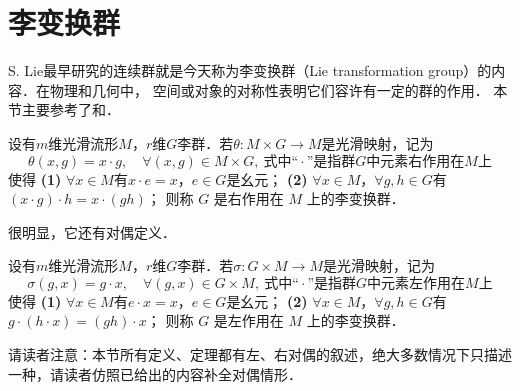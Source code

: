 
\section{李变换群}\label{chlg:sec_Lie-transformation-group}

S. Lie最早研究的连续群就是今天称为李变换群（Lie transformation group）的内容．在物理和几何中，
空间或对象的对称性表明它们容许有一定的群的作用．
本节主要参考了\parencite[\S 6.5]{chenwh2001}和\parencite[\S 9.3]{marsden-1999-IMS}．



\begin{definition}\label{chlg:def_Lie-Trans-R}
    设有$m$维光滑流形$M$，$r$维$G$李群．若$\theta:M\times G \to M$是光滑映射，记为
    \begin{equation*}
        \theta(x,g)=x\cdot g,\quad \forall(x,g)\in M\times G,
        \ \text{式中“} \cdot \text{”是指群}G\text{中元素右作用在}M \text{上}
    \end{equation*}
    使得
    {\bfseries (1)} $\forall x\in M$有$x\cdot e=x$，$e\in G$是幺元；
    {\bfseries (2)} $\forall x \in M$，$\forall g, h \in G$有$(x \cdot g) \cdot h=x \cdot(g h)$；
    则称 $G$ 是{\heiti 右作用在 $M$ 上的李变换群}．
\end{definition}

很明显，它还有对偶定义．
\begin{definition}\label{chlg:def_Lie-Trans-L}
    设有$m$维光滑流形$M$，$r$维$G$李群．若$\sigma:G\times M \to M$是光滑映射，记为
    \begin{equation*}
        \sigma(g,x)=g\cdot x,\quad \forall(g,x)\in G\times M,
        \ \text{式中“} \cdot \text{”是指群}G\text{中元素左作用在}M \text{上}
    \end{equation*}
    使得
    {\bfseries (1)} $\forall x \in M$有$e\cdot x=x$，$e\in G$是幺元；
    {\bfseries (2)} $\forall x \in M$，$\forall g, h \in G$有$g\cdot (h \cdot x) =(gh)\cdot x$；
    则称 $G$ 是{\heiti 左作用在 $M$ 上的李变换群}．
\end{definition}

请读者注意：本节所有定义、定理都有左、右对偶的叙述，绝大多数情况下只描述
一种，请读者仿照已给出的内容补全对偶情形．

